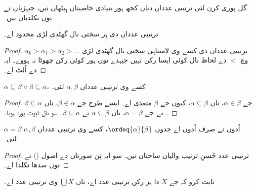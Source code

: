 \documentclass[../../../include/open-logic-section]{subfiles}
\begin{document}
گل پوری کرن لئی ترتیبی عدداں دیاں کجھ ہور بنیادی خاصیتاں ہِیٹھاں نیں،
جیہڑیاں  تے  توں نکلدیاں نیں۔

\begin{prop}
ترتیبی عدداں دی ہر سختی نال گھٹدی لڑی محدود اے۔
\end{prop}

\begin{proof}
ترتیبی عدداں دی کسے وی لامتناہی سختی نال گھٹدی لڑی
$\alpha_0 > \alpha_1 > \alpha_2 > \ldots$ وچ $<$ دے لحاظ نال
کوئی ایسا رکن نہیں جیہدے توں ہور کوئی رکن چھوٹا نہ ہووے۔
ایہ  دے اُلٹ اے۔
\end{proof}

\begin{prop}
$\alpha \subseteq \beta \lor \beta \subseteq \alpha$، کسے وی
ترتیبی عدداں $\alpha, \beta$ لئی۔
\end{prop}

\begin{proof}
جے $\alpha \in \beta$، تاں $\alpha \subseteq \beta$، کیوں جے $\beta$
متعدی اے۔ ایسے طرح جے $\beta \in \alpha$، تاں $\beta \subseteq \alpha$۔
تے جے $\alpha = \beta$، تاں $\alpha \subseteq \beta$ تے $\beta \subseteq \alpha$۔
سو  نال ثبوت پورا ہویا۔
\end{proof}

\begin{prop}
$\alpha = \beta$ اُدوں تے صرف اُدوں اے جدوں $\ordeq{\alpha}{\beta}$،
کسے وی ترتیبی عدداں $\alpha, \beta$ لئی۔
\end{prop}

\begin{proof}
ترتیبی عدد حُسنِ ترتیب والیاں ساختاں نیں۔ سو ایہ تِن صورتاں دے اصول
() تے 
توں سدھا نکلدا اے۔
\end{proof}

\begin{prob}
ثابت کرو کہ جے $X$ دا ہر رکن ترتیبی عدد اے، تاں $\bigcup X$ وی ترتیبی عدد اے۔
\end{prob}
\end{document}
